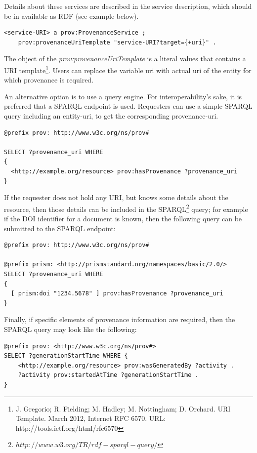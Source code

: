 Details about these services are described in the service description, which should be in available as RDF (see example below).

\begin{verbatim}
<service-URI> a prov:ProvenanceService ;
    prov:provenanceUriTemplate "service-URI?target={+uri}" .
\end{verbatim}

The object of the \emph{prov:provenanceUriTemplate} is a literal values that contains a URI template\footnote{J. Gregorio; R. Fielding; M. Hadley; M. Nottingham; D. Orchard. URI Template. March 2012, Internet RFC 6570. URL: http://tools.ietf.org/html/rfc6570}. Users can replace the variable uri with actual uri of the entity for which provenance is required.

An alternative option is to use a query engine. For interoperability's sake, it is preferred that a SPARQL endpoint is used. Requesters can use a simple SPARQL query including an entity-uri, to get the corresponding provenance-uri.

\begin{verbatim}
@prefix prov: http://www.w3c.org/ns/prov#

SELECT ?provenance_uri WHERE
{
  <http://example.org/resource> prov:hasProvenance ?provenance_uri
}

\end{verbatim}

If the requester does not hold any URI, but knows some details about the resource, then those details can be included in the SPARQL\footnote{$http://www.w3.org/TR/rdf-sparql-query/$} query; for example if the DOI identifier for a document is known, then the following query can be submitted to the SPARQL  endpoint:

\begin{verbatim}
@prefix prov: http://www.w3c.org/ns/prov#

@prefix prism: <http://prismstandard.org/namespaces/basic/2.0/>
SELECT ?provenance_uri WHERE
{
  [ prism:doi "1234.5678" ] prov:hasProvenance ?provenance_uri
}
\end{verbatim}

Finally, if specific elements of provenance information are required, then the SPARQL query may look like the following:

\begin{verbatim}
@prefix prov: <http://www.w3c.org/ns/prov#>
SELECT ?generationStartTime WHERE {
    <http://example.org/resource> prov:wasGeneratedBy ?activity .
    ?activity prov:startedAtTime ?generationStartTime .
}

\end{verbatim}

